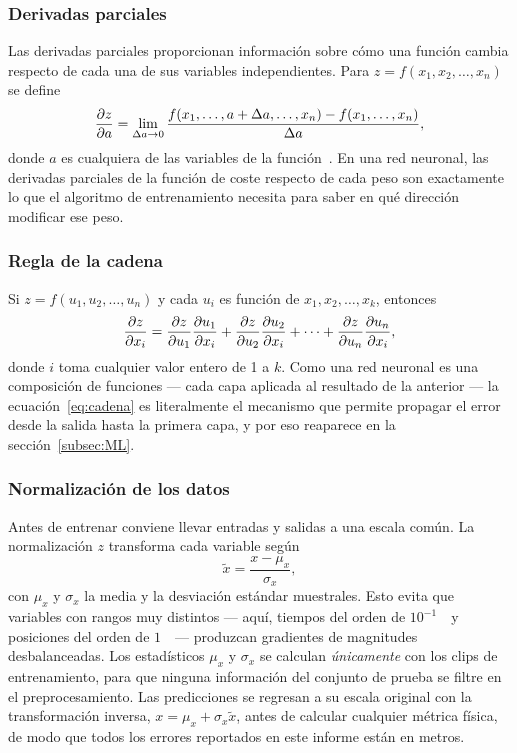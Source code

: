 \documentclass[titlepage,11pt]{article}
\begin{document}
\subsubsection{Derivadas parciales}
Las derivadas parciales proporcionan información sobre cómo una función cambia
respecto de cada una de sus variables independientes. Para
$z=f(x_1,x_2,\ldots,x_n)$ se define
\begin{equation}
  \pdv{z}{a}=\lim_{\Delta a\to0}
  \frac{f(x_1,\ldots,a+\Delta a,\ldots,x_n)-f(x_1,\ldots,x_n)}{\Delta a},
\end{equation}
donde $a$ es cualquiera de las variables de la función~\cite{zill_1985_clculo}.
En una red neuronal, las derivadas parciales de la función de coste respecto de
cada peso son exactamente lo que el algoritmo de entrenamiento necesita para
saber en qué dirección modificar ese peso.

\subsubsection{Regla de la cadena}
Si $z=f(u_1,u_2,\ldots,u_n)$ y cada $u_i$ es función de $x_1,x_2,\ldots,x_k$,
entonces~\cite{zill_1985_clculo}
\begin{equation}
  \pdv{z}{x_i}=\pdv{z}{u_1}\pdv{u_1}{x_i}+\pdv{z}{u_2}\pdv{u_2}{x_i}
  +\cdots+\pdv{z}{u_n}\pdv{u_n}{x_i},
  \label{eq:cadena}
\end{equation}
donde $i$ toma cualquier valor entero de 1 a $k$. Como una red neuronal es una
composición de funciones --- cada capa aplicada al resultado de la anterior ---
la ecuación~\eqref{eq:cadena} es literalmente el mecanismo que permite
propagar el error desde la salida hasta la primera capa, y por eso reaparece en
la sección~\ref{subsec:ML}.

\subsubsection{Normalización de los datos}
\label{subsubsec:zscore}
Antes de entrenar conviene llevar entradas y salidas a una escala común. La
normalización $z$ transforma cada variable según
\begin{equation}
  \tilde x = \frac{x-\mu_x}{\sigma_x},
  \label{eq:zscore}
\end{equation}
con $\mu_x$ y $\sigma_x$ la media y la desviación estándar muestrales. Esto
evita que variables con rangos muy distintos --- aquí, tiempos del orden de
$10^{-1}$~\second\ y posiciones del orden de $1$~\meter\ --- produzcan
gradientes de magnitudes desbalanceadas. Los estadísticos $\mu_x$ y $\sigma_x$
se calculan \emph{únicamente} con los clips de entrenamiento, para que ninguna
información del conjunto de prueba se filtre en el preprocesamiento. Las
predicciones se regresan a su escala original con la transformación inversa,
$x=\mu_x+\sigma_x\tilde x$, antes de calcular
cualquier métrica física, de modo que todos los errores reportados en este
informe están en metros.
\end{document}
